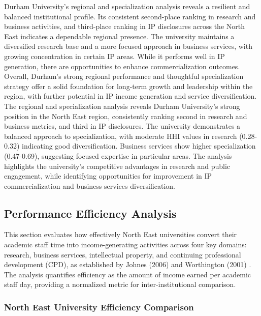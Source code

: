 \documentclass[journal,onecolumn, 10pt,draftclsnofoot]{IEEEtran}
\begin{document}
Durham University's regional and specialization analysis reveals a resilient and balanced institutional profile. Its consistent second-place ranking in research and business activities, and third-place ranking in IP disclosures across the North East indicates a dependable regional presence. The university maintains a diversified research base and a more focused approach in business services, with growing concentration in certain IP areas. While it performs well in IP generation, there are opportunities to enhance commercialization outcomes. Overall, Durham's strong regional performance and thoughtful specialization strategy offer a solid foundation for long-term growth and leadership within the region, with further potential in IP income generation and service diversification. The regional and specialization analysis reveals Durham University's strong position in the North East region, consistently ranking second in research and business metrics, and third in IP disclosures. The university demonstrates a balanced approach to specialization, with moderate HHI values in research (0.28-0.32) indicating good diversification. Business services show higher specialization (0.47-0.69), suggesting focused expertise in particular areas. The analysis highlights the university's competitive advantages in research and public engagement, while identifying opportunities for improvement in IP commercialization and business services diversification.

\subsection{Performance Efficiency Analysis}
\label{sec:performance-efficiency}

This section evaluates how effectively North East universities convert their academic staff time into income-generating activities across four key domains: research, business services, intellectual property, and continuing professional development (CPD), as established by Johnes (2006) \cite{johnes2006data} and Worthington (2001) \cite{worthington2001empirical}. The analysis quantifies efficiency as the amount of income earned per academic staff day, providing a normalized metric for inter-institutional comparison.

\subsubsection{North East University Efficiency Comparison}
\end{document}
